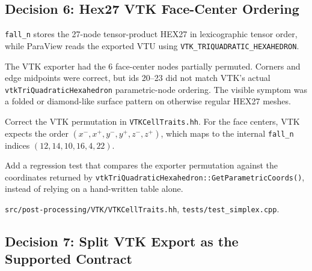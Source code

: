 \subsection{Decision 6: Hex27 VTK Face-Center Ordering}
\label{sec:dec_vtk_hex27}

\begin{description}[leftmargin=0pt,style=nextline]
  \item[Context] \texttt{fall\_n} stores the 27-node tensor-product HEX27 in
    lexicographic tensor order, while ParaView reads the exported VTU using
    \texttt{VTK\_TRIQUADRATIC\_HEXAHEDRON}.

  \item[Problem] The VTK exporter had the 6 face-center nodes partially
    permuted.  Corners and edge midpoints were correct, but ids 20--23 did not
    match VTK's actual \texttt{vtkTriQuadraticHexahedron} parametric-node
    ordering.  The visible symptom was a folded or diamond-like surface pattern
    on otherwise regular HEX27 meshes.

  \item[Decision] Correct the VTK permutation in
    \texttt{VTKCellTraits.hh}.  For the face centers, VTK expects the order
    $(x^-, x^+, y^-, y^+, z^-, z^+)$, which maps to the internal
    \texttt{fall\_n} indices $(12,14,10,16,4,22)$.

  \item[Verification] Add a regression test that compares the exporter
    permutation against the coordinates returned by
    \texttt{vtkTriQuadraticHexahedron::GetParametricCoords()}, instead of
    relying on a hand-written table alone.

  \item[Source] \texttt{src/post-processing/VTK/VTKCellTraits.hh},
    \texttt{tests/test\_simplex.cpp}.
\end{description}


\subsection{Decision 7: Split VTK Export as the Supported Contract}
\label{sec:dec_split_vtk_export}

